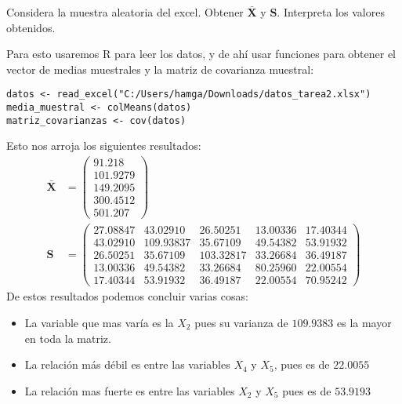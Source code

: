 \begin{problem}{8}
Considera la muestra aleatoria del excel. Obtener $\mathbf{\bar{X}}$ y $\mathbf{S}$. Interpreta los valores obtenidos.
\end{problem}
\begin{sol}
Para esto usaremos R para leer los datos, y de ahí usar funciones para obtener el vector de medias muestrales y la matriz de covarianza muestral:
\begin{verbatim}
datos <- read_excel("C:/Users/hamga/Downloads/datos_tarea2.xlsx")
media_muestral <- colMeans(datos)
matriz_covarianzas <- cov(datos) 
\end{verbatim}
Esto nos arroja los siguientes resultados:
\begin{align*}
\mathbf{\bar{X}} &= 
\begin{pmatrix}
91.218 \\
101.9279\\
149.2095 \\
300.4512 \\
501.207
\end{pmatrix} \\
\mathbf{S} &=
\begin{pmatrix}
27.08847 & 43.02910 & 26.50251 & 13.00336 & 17.40344 \\
43.02910 & 109.93837 & 35.67109 & 49.54382 & 53.91932 \\
26.50251 & 35.67109 & 103.32817 & 33.26684 & 36.49187 \\
13.00336 & 49.54382 & 33.26684 & 80.25960 & 22.00554 \\
17.40344 & 53.91932 & 36.49187 & 22.00554 & 70.95242
\end{pmatrix}
\end{align*}
De estos resultados podemos concluir varias cosas:
\begin{itemize}
\item La variable que mas varía es la $X_2$ pues su varianza de $109.9383$ es la mayor en toda la matriz.
\item La relación más débil es entre las variables $X_4$ y $X_5$, pues es de $22.0055$
\item La relación mas fuerte es entre las variables $X_2$ y $X_5$ pues es de $53.9193$
\end{itemize}
\end{sol}